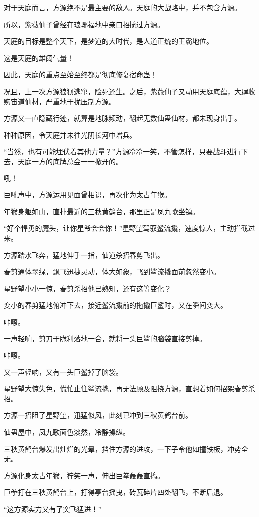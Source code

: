 \begin{this_body}
对于天庭而言，方源绝不是最主要的敌人。天庭的大战略中，并不包含方源。

所以，紫薇仙子曾经在琅琊福地中亲口招揽过方源。

天庭的目标是整个天下，是梦道的大时代，是人道正统的王霸地位。

这是天庭的雄阔气量！

因此，天庭的重点至始至终都是彻底修复宿命蛊！

况且，上一次方源狼狈逃窜，险死还生。之后，紫薇仙子又动用天庭底蕴，大肆收购宙道仙材，严重地干扰压制方源。

方源又一直隐藏行迹，就算是地脉频动，翻起无数仙蛊仙材，都未现身出手。

种种原因，令天庭并未往光阴长河中增兵。

“当然，也有可能埋伏着其他力量？”方源冷冷一笑，不管怎样，只要战斗进行下去，天庭一方的底牌总会一一掀开的。

吼！

巨吼声中，方源运用见面曾相识，再次化为太古年猴。

年猴身躯如山，直扑最近的三秋黄鹤台，那里正是凤九歌坐镇。

“好个悍勇的魔头，让你星爷会会你！”星野望驾驭鲨流撬，速度惊人，主动拦截过来。

方源踏水飞奔，猛地伸手一指，仙道杀招春剪飞出。

春剪通体翠绿，飘飞迅捷灵动，体大如象，飞到鲨流撬面前忽然变小。

星野望小小一惊，春剪杀招他已熟知，还有这等变化？

变小的春剪猛地俯冲下去，接近鲨流撬前的拖撬巨鲨时，又在瞬间变大。

咔嚓。

一声轻响，剪刀干脆利落地一合，就将一头巨鲨的脑袋直接剪掉。

咔嚓。

又一声轻响，又有一头巨鲨掉了脑袋。

星野望大惊失色，慌忙止住鲨流撬，再无法顾及阻挠方源，直想着如何招架春剪杀招。

方源一招阻了星野望，迅猛似风，此刻已冲到三秋黄鹤台前。

仙蛊屋中，凤九歌面色淡然，冷静操纵。

三秋黄鹤台爆发出灿烂的光晕，挡住方源的进攻，一下子令他如撞铁板，冲势全无。

方源化身太古年猴，狞笑一声，伸出巨拳轰轰直捣。

巨拳打在三秋黄鹤台上，打得亭台摇曳，砖瓦碎片四处翻飞，不断后退。

“这方源实力又有了突飞猛进！”


\end{this_body}
